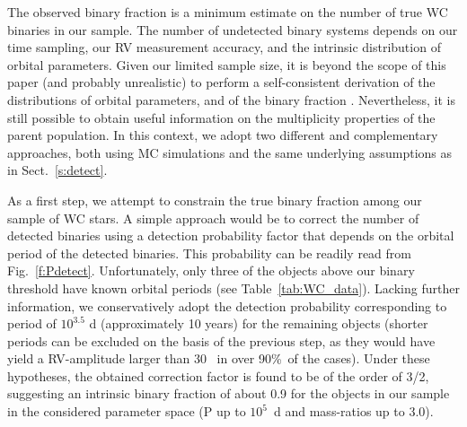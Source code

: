 The observed binary fraction is a minimum estimate on the number of true WC binaries in our sample. The number of undetected binary systems depends on our time sampling, our RV measurement accuracy, and the intrinsic distribution of orbital parameters. Given our limited sample size, it is beyond the scope of this paper (and probably unrealistic) to perform a self-consistent derivation of the distributions of orbital parameters, and of the binary fraction  \citep[as in, e.g., ][]{sana_binary_2012, sana_vlt-flames_2013}. Nevertheless, it is still possible to obtain useful information on the multiplicity properties of the parent population. In this context, we adopt two different and complementary approaches, both using MC simulations and the same underlying assumptions as in Sect.~\ref{s:detect}.


As a first step, we attempt to constrain the true binary fraction among our sample of WC stars. A simple approach would be to correct the number of detected binaries using a detection probability factor that depends on the orbital period of the detected binaries. This probability can be readily read from Fig.~\ref{f:Pdetect}. Unfortunately, only three of the objects above our binary threshold have known orbital periods (see Table~\ref{tab:WC_data}). Lacking further information, we conservatively adopt the detection probability corresponding to period of $10^{3.5}$ d (approximately 10 years) for the remaining objects (shorter periods can be excluded on the basis of the previous step, as they would have yield a RV-amplitude larger than 30~\kms{} in over 90\%\ of the cases). Under these hypotheses, the obtained correction factor is found to be of the order of 3/2, suggesting an intrinsic binary fraction of about 0.9 for the objects in our sample in the considered parameter space (P up to $10^5$~d and mass-ratios up to 3.0).

